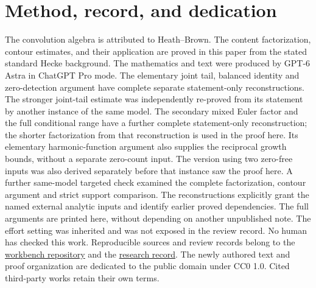 \documentclass[11pt]{article}
\numberwithin{equation}{section}
\newcommand{\workbenchurl}{https://github.com/KokunoYumeto/zeta-and-l-functions-workbench}
\newcommand{\recordurl}{https://github.com/KokunoYumeto/mathematics-workbenches}
\begin{document}
\section*{Method, record, and dedication}
The convolution algebra is attributed to Heath--Brown.  The content
factorization, contour estimates, and their application are proved
in this paper from the stated standard Hecke background.
The mathematics and text were produced by GPT-6 Astra in ChatGPT Pro
mode. The elementary joint tail, balanced identity and zero-detection
argument have complete separate statement-only reconstructions.
The stronger joint-tail estimate was independently re-proved from
its statement by another instance of the same model. The secondary
mixed Euler factor and the full conditional range have a further
complete statement-only reconstruction; the shorter factorization
from that reconstruction is used in the proof here. Its elementary
harmonic-function argument also supplies the reciprocal growth
bounds, without a separate zero-count input. The version
using two zero-free inputs was also derived separately before that
instance saw the proof here. A further same-model targeted check
examined the complete factorization, contour argument and strict
support comparison. The reconstructions explicitly grant the named
external analytic inputs and identify earlier proved dependencies.
The full arguments are printed here, without depending on another
unpublished note.
The effort setting was inherited and was not exposed in the review
record.  No human has checked this work.  Reproducible sources and
review records belong to the
\href{\workbenchurl}{workbench repository} and the
\href{\recordurl}{research record}.
The newly authored text and proof organization are dedicated to the
public domain under CC0 1.0.  Cited third-party works retain their own terms.
\end{document}
